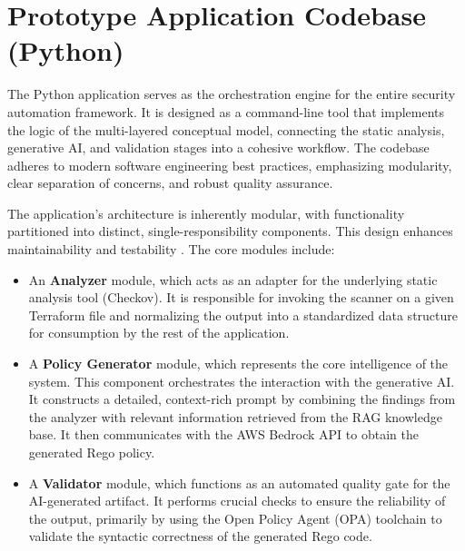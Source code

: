 
\section{Prototype Application Codebase (Python)}

The Python application serves as the orchestration engine for the entire security automation framework. It is designed as a command-line tool that implements the logic of the multi-layered conceptual model, connecting the static analysis, generative AI, and validation stages into a cohesive workflow. The codebase adheres to modern software engineering best practices, emphasizing modularity, clear separation of concerns, and robust quality assurance.

The application's architecture is inherently modular, with functionality partitioned into distinct, single-responsibility components. This design enhances maintainability and testability \cite{martin_clean_2008}. The core modules include:

\begin{itemize}
    \item An \textbf{Analyzer} module, which acts as an adapter for the underlying static analysis tool (Checkov). It is responsible for invoking the scanner on a given Terraform file and normalizing the output into a standardized data structure for consumption by the rest of the application.
    \item A \textbf{Policy Generator} module, which represents the core intelligence of the system. This component orchestrates the interaction with the generative AI. It constructs a detailed, context-rich prompt by combining the findings from the analyzer with relevant information retrieved from the RAG knowledge base. It then communicates with the AWS Bedrock API to obtain the generated Rego policy.
    \item A \textbf{Validator} module, which functions as an automated quality gate for the AI-generated artifact. It performs crucial checks to ensure the reliability of the output, primarily by using the Open Policy Agent (OPA) toolchain to validate the syntactic correctness of the generated Rego code.
\end{itemize}

